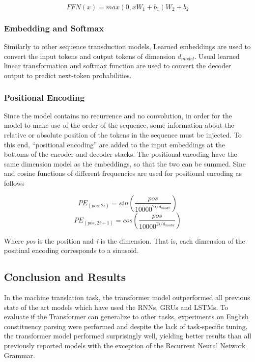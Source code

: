 \begin{equation}
    FFN(x) = max(0, xW_1 + b_1)W_2 + b_2
\end{equation}

\subsubsection{Embedding and Softmax}
Similarly to other sequence transduction models, Learned embeddings are used to convert the input tokens and output tokens of dimension $d_{model}$. Usual learned linear transformation and softmax function are used to convert the decoder output to predict next-token probabilities. 

\subsubsection{Positional Encoding}
Since the model contains no recurrence and no convolution, in order for the model to make use of the order of the sequence, some information about the relative or absolute position of the tokens in the sequence must be injected. To this end, “positional encoding” are added to the input embeddings at the bottoms of the encoder and decoder stacks. The positional encoding have the same dimension model as the embeddings, so that the two can be summed. Sine and cosine functions of different frequencies are used for positional encoding as follows

\begin{equation}
    PE_{(pos, 2i)} = sin(\frac{pos}{10000^{2i/d_{model}}})
\end{equation}
\begin{equation}
    PE_{(pos, 2i + 1)} = cos(\frac{pos}{10000^{2i/d_{model}}})
\end{equation}

Where \textit{pos} is the position and \textit{i} is the dimension. That is, each dimension of the positinal encoding corresponds to a sinusoid.

\subsection{Conclusion and Results}
In the machine translation task, the transformer model outperformed all previous state of the art models which have used the RNNs, GRUs and LSTMs. To evaluate if the Transformer can generalize to other tasks, experiments on English constituency parsing  were performed and despite the lack of task-specific tuning, the transformer model performed surprisingly well, yielding better results than all previously reported models with the exception of the Recurrent Neural Network Grammar.

